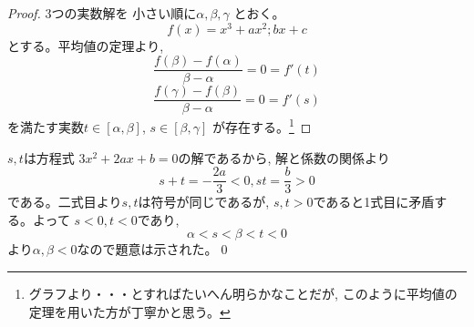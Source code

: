 
\begin{proof}
3つの実数解を 小さい順に$\alpha, \beta ,\gamma$ とおく。
\[f(x)=x^3+ax^2;bx+c\]
とする。平均値の定理より, 
\[\dfrac{f(\beta) -f(\alpha)}{\beta -\alpha}=0=f'(t) \]
\[\dfrac{f(\gamma) -f(\beta)}{\beta -\alpha}=0=f'(s) \]
を満たす実数$t\in [\alpha, \beta]$, $s\in [\beta , \gamma]$ が存在する。\footnote{グラフより・・・とすればたいへん明らかなことだが, このように平均値の定理を用いた方が丁寧かと思う。}
\end{proof}
$s,t$は方程式 $3x^2 + 2ax +b=0$の解であるから, 解と係数の関係より
\[s+t=-\dfrac{2a}{3}<0,　　st=\dfrac{b}{3}>0\]
である。二式目より$s, t$は符号が同じであるが, $s,t>0$であると1式目に矛盾する。よって $s<0 , t<0$であり, 
\[\alpha< s< \beta < t<0\]
より$\alpha,\beta <0$なので題意は示された。\qed
